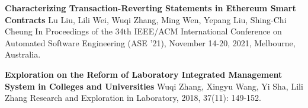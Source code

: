 \begin{scholarship}
	{\textbf{Characterizing Transaction-Reverting Statements in Ethereum Smart Contracts}}
	{Lu Liu, Lili Wei, Wuqi Zhang, Ming Wen, Yepang Liu, Shing-Chi Cheung}
	\scholarshipentry{}
	{In Proceedings of the 34th IEEE/ACM International Conference on Automated Software Engineering (ASE ’21), November 14-20, 2021, Melbourne, Australia.}

	{\textbf{Exploration on the Reform of Laboratory Integrated Management System in Colleges and Universities}}
	{Wuqi Zhang, Xingyu Wang, Yi Sha, Lili Zhang}
	\scholarshipentry{}
	{Research and Exploration in Laboratory, 2018, 37(11): 149-152.}
\end{scholarship}
